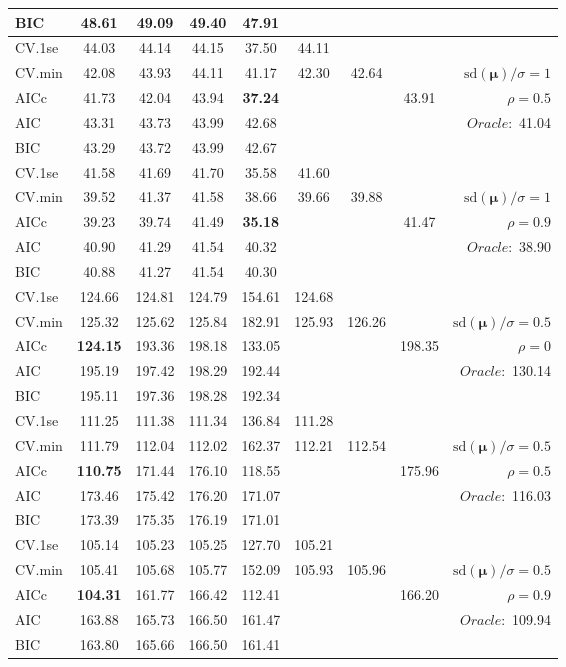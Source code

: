 \begin{table}
\begin{center}
\begin{tabular}{l*{7}{c}|r}
BIC & 48.61 & 49.09 & 49.40 & 47.91 & & & &  \\
 \hline 
CV.1se & 44.03 & 44.14 & 44.15 & 37.50 & 44.11 & & & \\
CV.min & 42.08 & 43.93 & 44.11 & 41.17 & 42.30 & 42.64 & & $\mathrm{sd}(\mathbf{\mu})/\sigma=1$ \\
AICc & 41.73 & 42.04 & 43.94 & {\bf 37.24} & & & 43.91 &  $\rho=0.5$ \\
AIC & 43.31 & 43.73 & 43.99 & 42.68 & & & &  \multirow{2}{*}{$Oracle: $ 41.04} \\
BIC & 43.29 & 43.72 & 43.99 & 42.67 & & & &  \\
 \hline 
CV.1se & 41.58 & 41.69 & 41.70 & 35.58 & 41.60 & & & \\
CV.min & 39.52 & 41.37 & 41.58 & 38.66 & 39.66 & 39.88 & & $\mathrm{sd}(\mathbf{\mu})/\sigma=1$ \\
AICc & 39.23 & 39.74 & 41.49 & {\bf 35.18} & & & 41.47 &  $\rho=0.9$ \\
AIC & 40.90 & 41.29 & 41.54 & 40.32 & & & &  \multirow{2}{*}{$Oracle: $ 38.90} \\
BIC & 40.88 & 41.27 & 41.54 & 40.30 & & & &  \\
 \hline 
CV.1se & 124.66 & 124.81 & 124.79 & 154.61 & 124.68 & & & \\
CV.min & 125.32 & 125.62 & 125.84 & 182.91 & 125.93 & 126.26 & & $\mathrm{sd}(\mathbf{\mu})/\sigma=0.5$ \\
AICc & {\bf 124.15} & 193.36 & 198.18 & 133.05 & & & 198.35 &  $\rho=0$ \\
AIC & 195.19 & 197.42 & 198.29 & 192.44 & & & &  \multirow{2}{*}{$Oracle: $ 130.14} \\
BIC & 195.11 & 197.36 & 198.28 & 192.34 & & & &  \\
 \hline 
CV.1se & 111.25 & 111.38 & 111.34 & 136.84 & 111.28 & & & \\
CV.min & 111.79 & 112.04 & 112.02 & 162.37 & 112.21 & 112.54 & & $\mathrm{sd}(\mathbf{\mu})/\sigma=0.5$ \\
AICc & {\bf 110.75} & 171.44 & 176.10 & 118.55 & & & 175.96 &  $\rho=0.5$ \\
AIC & 173.46 & 175.42 & 176.20 & 171.07 & & & &  \multirow{2}{*}{$Oracle: $ 116.03} \\
BIC & 173.39 & 175.35 & 176.19 & 171.01 & & & &  \\
 \hline 
CV.1se & 105.14 & 105.23 & 105.25 & 127.70 & 105.21 & & & \\
CV.min & 105.41 & 105.68 & 105.77 & 152.09 & 105.93 & 105.96 & & $\mathrm{sd}(\mathbf{\mu})/\sigma=0.5$ \\
AICc & {\bf 104.31} & 161.77 & 166.42 & 112.41 & & & 166.20 &  $\rho=0.9$ \\
AIC & 163.88 & 165.73 & 166.50 & 161.47 & & & &  \multirow{2}{*}{$Oracle: $ 109.94} \\
BIC & 163.80 & 165.66 & 166.50 & 161.41 & & & &  \\
 \hline 
\end{tabular}
\end{center}
\vspace{-1cm}
\end{table}
